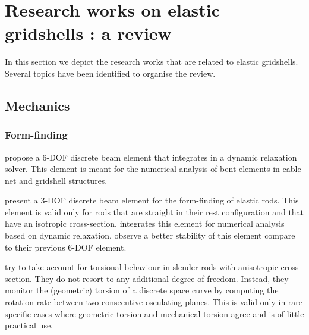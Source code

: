 


\section{Research works on elastic gridshells : a review}
\label{sec=review_research}
In this section we depict the research works that are related to elastic gridshells. Several topics have been identified to organise the review.

\subsection{Mechanics}

\subsubsection{Form-finding}

 propose a 6-DOF discrete beam element that integrates in a dynamic relaxation solver. This element is meant for the numerical analysis of bent elements in cable net and gridshell structures.

 present a 3-DOF discrete beam element for the form-finding of elastic rods. This element is valid only for rods that are straight in their rest configuration and that have an isotropic cross-section.  integrates this element for numerical analysis based on dynamic relaxation.  observe a better stability of this element compare to their previous 6-DOF element.

 try to take account for torsional behaviour in slender rods with anisotropic cross-section. They do not resort to any additional degree of freedom. Instead, they monitor the (geometric) torsion of a discrete space curve by computing the rotation rate between two consecutive osculating planes. This is valid only in rare specific cases where geometric torsion and mechanical torsion agree and is of little practical use.

